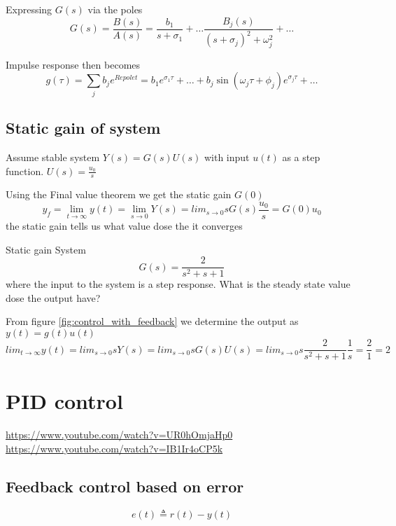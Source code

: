 Expressing $G(s)$ via the poles
\begin{equation*}
    G(s)=\frac{B(s)}{A(s)}= \frac{b_1}{s+\sigma_1} + \ldots \frac{B_j(s)}{(s+\sigma_j)^2+\omega_j^2} + \ldots
\end{equation*}

Impulse response then becomes
\begin{equation*}
   g(\tau) = \sum_j b_je^{Re{pole}t} = b_1e^{\sigma_1\tau}+\ldots+b_j\sin(\omega_j\tau+\phi_j)e^{\sigma_j\tau}+\ldots
\end{equation*}

\subsection{Static gain of system}
Assume stable system $Y(s)=G(s)U(s)$ with input $u(t)$ as a step function. $U(s)=\frac{u_0}{s}$

Using the Final value theorem we get the static gain $G(0)$
\begin{equation*}
    y_f  = \lim_{t\to\infty}y(t) = \lim_{s\to 0}Y(s) = lim_{s\to 0}sG(s)\frac{u_0}{s} = G(0)u_0
\end{equation*}
the static gain tells us what value dose the it converges

\begin{exampleblock}{Static gain}
   System
   \begin{equation*}
       G(s)=\frac{2}{s^2 + s + 1}
   \end{equation*}
   where the input to the system is a step response. What is the steady state value dose
   the output have?

   From figure \ref{fig:control_with_feedback} we determine the output as $y(t)=g(t)u(t)$
   \begin{equation*}
        lim_{t\to\infty}y(t) = lim_{s\to0} sY(s) = lim_{s\to0} sG(s)U(s) = lim_{s\to0} s\frac{2}{s^2 + s + 1}\frac{1}{s} = \frac{2}{1} = 2
   \end{equation*}
\end{exampleblock}

\section{PID control}
\url{https://www.youtube.com/watch?v=UR0hOmjaHp0} \newline
\url{https://www.youtube.com/watch?v=IB1Ir4oCP5k}
\subsection{Feedback control based on error}
\begin{equation*}
    e(t) \triangleq r(t)-y(t)
\end{equation*}

